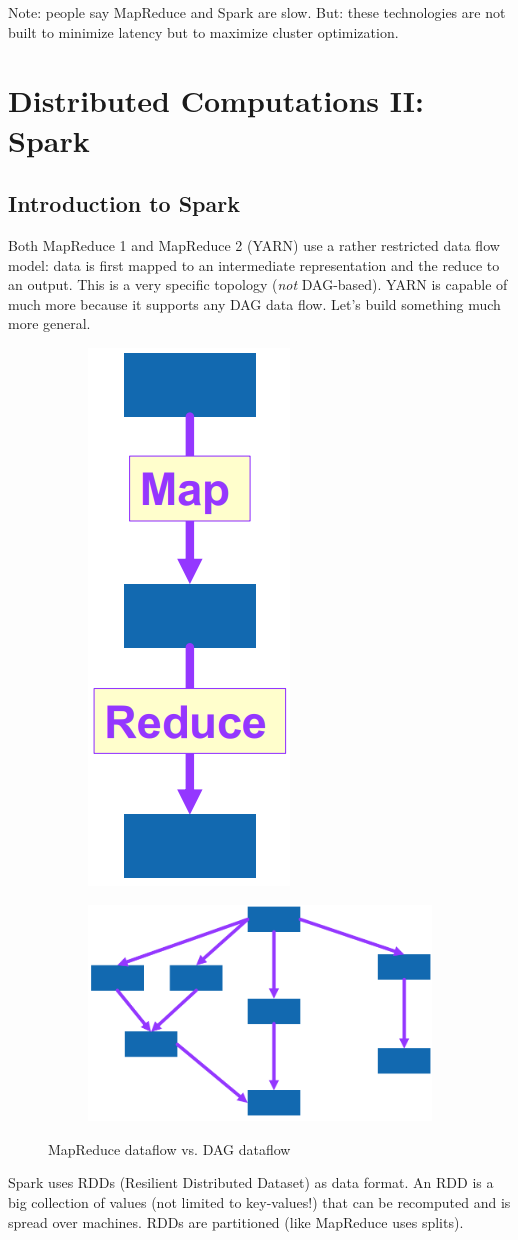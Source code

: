 \documentclass[11pt,oneside,a4paper]{article}
\begin{document}
Note: people say MapReduce and Spark are slow. But: these technologies are not built to minimize latency but to maximize cluster optimization.


\section{Distributed Computations II: Spark}

\subsection{Introduction to Spark}

Both MapReduce 1 and MapReduce 2 (YARN) use a rather restricted data flow model: data is first mapped to an intermediate representation and the reduce to an output. This is a very specific topology (\textit{not} DAG-based). YARN is capable of much more because it supports any DAG data flow. Let's build something much more general.

\begin{figure}[hb!]
	\centering
	\begin{subfigure}[t]{.5\textwidth}
		\centering
		\includegraphics[width=0.1\linewidth]{figures/spark_mr_intuition}
		\label{fig:sparkmrintuition}
	\end{subfigure}%
	\begin{subfigure}[t]{.5\textwidth}
		\centering
		\includegraphics[width=0.4\linewidth]{figures/spark_dag_dataflow}
		\label{fig:sparkdag}
	\end{subfigure}
	\caption{MapReduce dataflow vs. DAG dataflow}
\end{figure}

Spark uses RDDs (Resilient Distributed Dataset) as data format. An RDD is a big collection of values (not limited to key-values!) that can be recomputed and is spread over machines. RDDs are partitioned (like MapReduce uses splits).
\end{document}
